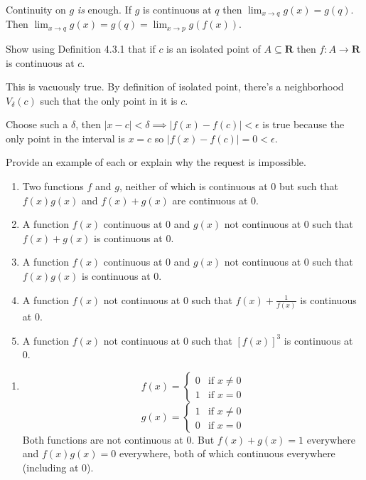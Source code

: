 \documentclass{oxmathproblems}
\begin{document}
\begin{questions}
\begin{solution}
\begin{enumerate}[label=(\alph*)]
    Continuity on $g$ \textit{is} enough. If $g$ is continuous at $q$ then $\lim_{x \to q}g(x)=g(q)$.
    Then $\lim_{x \to q}g(x)=g(q)=\lim_{x \to p}g(f(x))$.
  \end{enumerate}
\end{solution}

\miquestion Show using Definition 4.3.1 that if $c$ is an isolated point of $A \subseteq \textbf{R}$ then $f: A \to \textbf{R}$ is continuous at $c$.
\begin{solution}
  This is vacuously true. By definition of isolated point, there's a neighborhood $V_{\delta}(c)$ such that the only point in it is $c$.

  Choose such a $\delta$, then $|x-c| < \delta \implies |f(x)-f(c)| < \epsilon$ is true because the only point in the interval is $x=c$ so
  $|f(x)-f(c)| = 0 < \epsilon$.
\end{solution}

\miquestion Provide an example of each or explain why the request is impossible.
\begin{enumerate}[label=(\alph*)]
  \item Two functions $f$ and $g$, neither of which is continuous at 0 but such that $f(x)g(x)$ and $f(x)+g(x)$ are continuous at 0.
  \item A function $f(x)$ continuous at 0 and $g(x)$ not continuous at 0 such that $f(x)+g(x)$ is continuous at 0.
  \item A function $f(x)$ continuous at 0 and $g(x)$ not continuous at 0 such that $f(x)g(x)$ is continuous at 0.
  \item A function $f(x)$ not continuous at 0 such that $f(x)+\frac{1}{f(x)}$ is continuous at 0.
  \item A function $f(x)$ not continuous at 0 such that $[f(x)]^{3}$ is continuous at 0.
\end{enumerate}

\begin{solution}
  \begin{enumerate}[label=(\alph*)]
    \item \[f(x) = 
        \begin{cases}
        0 & \text{if } x \ne 0 \\
        1 & \text{if } x = 0
        \end{cases}
      \]
      \[g(x) = 
        \begin{cases}
        1 & \text{if } x \ne 0 \\
        0 & \text{if } x = 0
        \end{cases}
      \]
    Both functions are not continuous at 0. But $f(x)+g(x)=1$ everywhere and $f(x)g(x)=0$ everywhere, both of which continuous everywhere (including at 0).
  

\end{enumerate}
\end{solution}
\end{questions}
\end{document}
